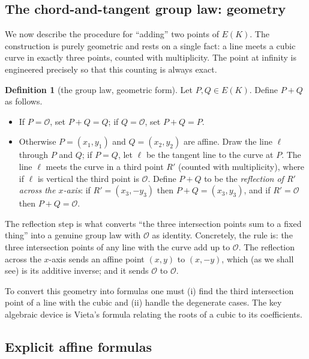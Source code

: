 \documentclass[11pt,a4paper]{article}
\theoremstyle{definition}
\newtheorem{definition}[theorem]{Definition}
\theoremstyle{remark}
\begin{document}
\subsection{The chord-and-tangent group law: geometry}

We now describe the procedure for ``adding'' two points of \(E(K)\). The construction is purely geometric and rests on a single fact: a line meets a cubic curve in exactly three points, counted with multiplicity. The point at infinity is engineered precisely so that this counting is always exact.

\begin{definition}[the group law, geometric form]\label{ellipticcurves:def-grouplaw-geom}
Let \(P, Q \in E(K)\). Define \(P + Q\) as follows.
\begin{itemize}
  \item If \(P = \mathcal{O}\), set \(P + Q = Q\); if \(Q = \mathcal{O}\), set \(P + Q = P\).
  \item Otherwise \(P = (x_1, y_1)\) and \(Q = (x_2, y_2)\) are affine. Draw the line \(\ell\) through \(P\) and \(Q\); if \(P = Q\), let \(\ell\) be the tangent line to the curve at \(P\). The line \(\ell\) meets the curve in a third point \(R'\) (counted with multiplicity), where if \(\ell\) is vertical the third point is \(\mathcal{O}\). Define \(P + Q\) to be the \emph{reflection of \(R'\) across the \(x\)-axis}: if \(R' = (x_3, -y_3)\) then \(P + Q = (x_3, y_3)\), and if \(R' = \mathcal{O}\) then \(P + Q = \mathcal{O}\).
\end{itemize}
\end{definition}

The reflection step is what converts ``the three intersection points sum to a fixed thing'' into a genuine group law with \(\mathcal{O}\) as identity. Concretely, the rule is: the three intersection points of any line with the curve add up to \(\mathcal{O}\). The reflection across the \(x\)-axis sends an affine point \((x, y)\) to \((x, -y)\), which (as we shall see) is its additive inverse; and it sends \(\mathcal{O}\) to \(\mathcal{O}\).

To convert this geometry into formulas one must (i) find the third intersection point of a line with the cubic and (ii) handle the degenerate cases. The key algebraic device is Vieta's formula relating the roots of a cubic to its coefficients.

\subsection{Explicit affine formulas}
\end{document}
